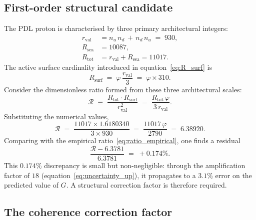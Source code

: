 \documentclass[11pt,a4paper]{article}
\begin{document}
\subsection{First-order structural candidate}

The PDL proton \cite{Combinatorial_Proton_v2_2026} is characterised by three primary architectural integers:
\begin{align}
    r_{\mathrm{val}} &= n_u\,n_d\,+\,n_d\,n_u \;=\; 930, 
        \label{eq:r_val_def}\\
    R_{\mathrm{sea}} &= 10087,\\
    R_{\mathrm{tot}} &= r_{\mathrm{val}} + R_{\mathrm{sea}} = 11017.
\end{align}
The active surface cardinality introduced in equation~\eqref{eq:R_surf} is
\begin{equation}
    R_{\mathrm{surf}} \;=\; \varphi\,\frac{r_{\mathrm{val}}}{3}
    \;=\; \varphi \times 310.
    \label{eq:R_surf_repeat}
\end{equation}
Consider the dimensionless ratio formed from these three architectural scales:
\begin{equation}
    \mathcal{R} 
    \;\equiv\; 
    \frac{R_{\mathrm{tot}}\cdot R_{\mathrm{surf}}}{r_{\mathrm{val}}^2}
    \;=\; \frac{R_{\mathrm{tot}}\,\varphi}{3\,r_{\mathrm{val}}}.
    \label{eq:R_ratio}
\end{equation}
Substituting the numerical values,
\begin{equation}
    \mathcal{R} 
    \;=\; \frac{11017\times 1.6180340}{3\times 930}
    \;=\; \frac{11017\,\varphi}{2790}
    \;=\; 6.38920.
    \label{eq:R_ratio_value}
\end{equation}
Comparing with the empirical ratio~\eqref{eq:ratio_empirical}, one finds a residual
\begin{equation}
    \frac{\mathcal{R} - 6.3781}{6.3781} 
    \;=\; +0.174\%.
    \label{eq:residual}
\end{equation}
This $0.174\%$ discrepancy is small but non-negligible: through the amplification factor of $18$ (equation~\eqref{eq:uncertainty_up}), it propagates to a $3.1\%$ error on the predicted value of $G$. 
A structural correction factor is therefore required.

\subsection{The coherence correction factor}
\end{document}
